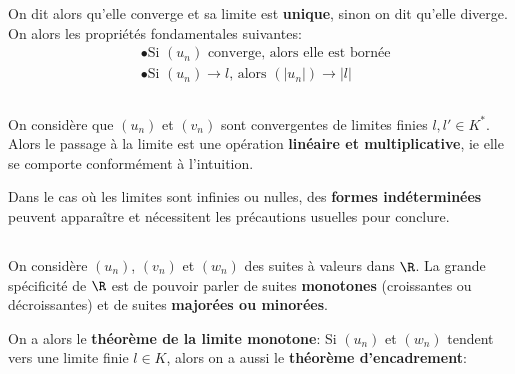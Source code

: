On dit alors qu'elle converge et sa limite est \textbf{unique}, sinon on dit qu'elle diverge.\+
On alors les propriétés fondamentales suivantes:
\begin{align*}
    &\bullet \text{Si \((u_n)\) converge, alors elle est bornée}\\
    &\bullet \text{Si \((u_n) \rightarrow l\), alors \((|u_n|) \rightarrow |l|\)}
\end{align*}

\subsection*{}
On considère que \((u_n)\) et \((v_n)\) sont convergentes de limites finies \(l, l' \in K^*\).\+
Alors le passage à la limite est une opération \textbf{linéaire et multiplicative}, ie elle se comporte conformément à l'intuition.\<

Dans le cas où les limites sont infinies ou nulles, des \textbf{formes indéterminées} peuvent apparaître et nécessitent les précautions usuelles pour conclure.

\subsection*{}
On considère \((u_n)\), \((v_n)\) et \((w_n)\) des suites à valeurs dans \(\R\). La grande spécificité de \(\R\) est de pouvoir parler de suites \textbf{monotones} (croissantes ou décroissantes) et de suites \textbf{majorées ou minorées}.\<

On a alors le \textbf{théorème de la limite monotone}:
Si \((u_n)\) et \((w_n)\) tendent vers une limite finie \(l \in K\), alors on a aussi le \textbf{théorème d'encadrement}:

